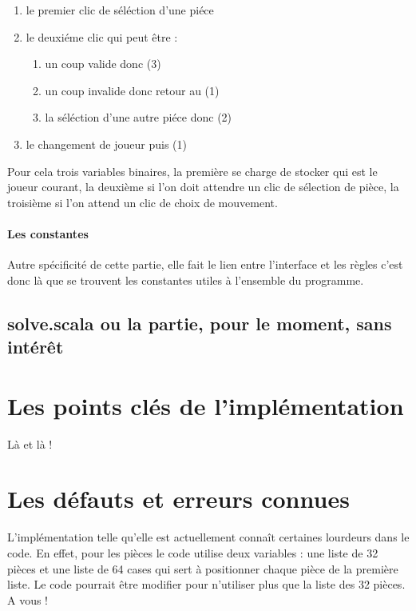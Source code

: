 \documentclass[a4paper]{article}
\begin{document}
\begin{enumerate}
	\item le premier clic de séléction d'une piéce
	\item le deuxiéme clic qui peut être :
		\begin{enumerate}
		\item un coup valide donc (3)
		\item un coup invalide donc retour au (1)
		\item la séléction d'une autre piéce donc (2)
		\end{enumerate}
	\item le changement de joueur puis (1)
\end{enumerate}
\vspace{0.5 cm}

Pour cela trois variables binaires, la première se charge de stocker qui est le joueur courant, la deuxième si l'on doit attendre un clic de sélection de pièce, la troisième si l'on attend un clic de choix de mouvement.\\

\paragraph{Les constantes} Autre spécificité de cette partie, elle fait le lien entre l'interface et les règles c'est donc là que se trouvent les constantes utiles à l'ensemble du programme.

\subsection{solve.scala ou la partie, pour le moment, sans intérêt}

\section{Les points clés de l'implémentation}

Là et là !

\section{Les défauts et erreurs connues}

L'implémentation telle qu'elle est actuellement connaît certaines lourdeurs dans le code. En effet, pour les pièces le code utilise deux variables : une liste de 32 pièces et une liste de 64 cases qui sert à positionner chaque pièce de la première liste. Le code pourrait être modifier pour n'utiliser plus que la liste des 32 pièces. \\

A vous !
\end{document}
